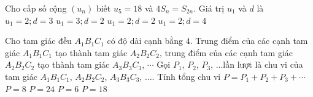 \begin{ex}%
	Cho cấp số cộng $(u_n)$ biết $u_5=18$ và $4S_n=S_{2n}$. Giá trị $u_1$ và $d$ là 
	\choice 
		{$u_1=2;  d=3$}
		{$u_1=3;  d=2$}
		 {$u_1=2; d=2$}
		 {\True $u_1=2; d=4$}
\end{ex}

\begin{ex}%
	Cho tam giác đều $A_1B_1C_1$ có độ dài cạnh bằng $4$. Trung điểm của các cạnh tam giác $A_1B_1C_1$ tạo thành tam giác $A_2B_2C_2$, trung điểm của các cạnh tam giác $A_2B_2C_2$ tạo  thành tam giác $A_3B_3C_3$, $\cdots$ Gọi $P_1$, $P_2$, $P_3$, $\ldots$lần lượt là chu vi của tam giác $A_1B_1C_1$, $A_2B_2C_2$, $A_3B_3C_3$, $\ldots$. Tính tổng chu vi $P=P_1+P_2+P_3+\cdots$
	\choice 
		 {$P=8$}
		 {\True $P=24$}
		 {$P=6$}
		{$P=18$} 
\end{ex}



